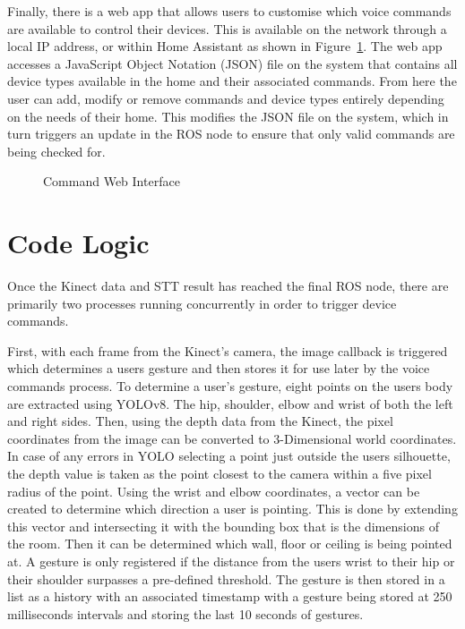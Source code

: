 Finally, there is a web app that allows users to customise which voice commands are available to control their devices.
This is available on the network through a local IP address, or within Home Assistant as shown in Figure~\ref{fig:command_interface}.
The web app accesses a JavaScript Object Notation (JSON) file on the system that contains all device types available in the home and their associated commands.
From here the user can add, modify or remove commands and device types entirely depending on the needs of their home.
This modifies the JSON file on the system, which in turn triggers an update in the ROS node to ensure that only valid commands are being checked for.

\begin{figure}[!htb]
    \caption{Command Web Interface}
    \label{fig:command_interface}
\end{figure}

\section{Code Logic}

Once the Kinect data and STT result has reached the final ROS node, there are primarily two processes running concurrently in order to trigger device commands.

First, with each frame from the Kinect's camera, the image callback is triggered which determines a users gesture and then stores it for use later by the voice commands process.
To determine a user's gesture, eight points on the users body are extracted using YOLOv8.
The hip, shoulder, elbow and wrist of both the left and right sides.
Then, using the depth data from the Kinect, the pixel coordinates from the image can be converted to 3-Dimensional world coordinates.
In case of any errors in YOLO selecting a point just outside the users silhouette, the depth value is taken as the point closest to the camera within a five pixel radius of the point.
Using the wrist and elbow coordinates, a vector can be created to determine which direction a user is pointing.
This is done by extending this vector and intersecting it with the bounding box that is the dimensions of the room.
Then it can be determined which wall, floor or ceiling is being pointed at.
A gesture is only registered if the distance from the users wrist to their hip or their shoulder surpasses a pre-defined threshold.
The gesture is then stored in a list as a history with an associated timestamp with a gesture being stored at 250 milliseconds intervals and storing the last 10 seconds of gestures.

